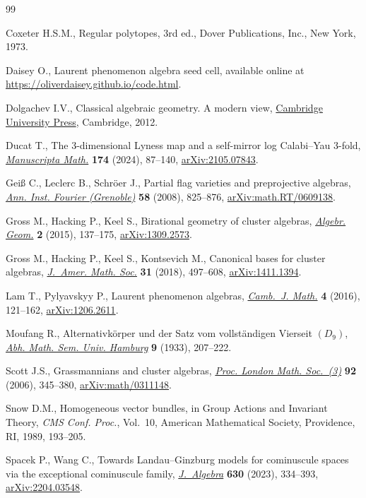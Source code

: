 \begin{thebibliography}{99}
\footnotesize\itemsep=0pt

Coxeter H.S.M., Regular polytopes, 3rd ed., Dover Publications, Inc., New York,
 1973.

Daisey O., Laurent phenomenon algebra seed cell, available online at
 \url{https://oliverdaisey.github.io/code.html}.

Dolgachev I.V., Classical algebraic geometry. {A} modern view, \href{https://doi.org/10.1017/CBO9781139084437}{Cambridge
 University Press}, Cambridge, 2012.

Ducat T., The 3-dimensional {L}yness map and a self-mirror log {C}alabi--{Y}au
 3-fold, \href{https://doi.org/10.1007/s00229-023-01497-0}{\textit{Manuscripta Math.}} \textbf{174} (2024), 87--140,
 \href{https://arxiv.org/abs/2105.07843}{arXiv:2105.07843}.

Gei{\ss} C., Leclerc B., Schr\"oer J., Partial flag varieties and preprojective
 algebras, \href{https://doi.org/10.5802/aif.2371}{\textit{Ann. Inst. Fourier (Grenoble)}} \textbf{58} (2008),
 825--876, \href{https://arxiv.org/abs/math.RT/0609138}{arXiv:math.RT/0609138}.

Gross M., Hacking P., Keel S., Birational geometry of cluster algebras,
 \href{https://doi.org/10.14231/AG-2015-007}{\textit{Algebr. Geom.}} \textbf{2} (2015), 137--175, \href{https://arxiv.org/abs/1309.2573}{arXiv:1309.2573}.

Gross M., Hacking P., Keel S., Kontsevich M., Canonical bases for cluster
 algebras, \href{https://doi.org/10.1090/jams/890}{\textit{J.~Amer. Math. Soc.}} \textbf{31} (2018), 497--608,
 \href{https://arxiv.org/abs/1411.1394}{arXiv:1411.1394}.

Lam T., Pylyavskyy P., Laurent phenomenon algebras, \href{https://doi.org/10.4310/CJM.2016.v4.n1.a2}{\textit{Camb.~J. Math.}}
 \textbf{4} (2016), 121--162, \href{https://arxiv.org/abs/1206.2611}{arXiv:1206.2611}.

Moufang R., Alternativk\"orper und der {S}atz vom vollst\"andigen {V}ierseit
 {$(D_9)$}, \href{https://doi.org/10.1007/BF02940648}{\textit{Abh. Math. Sem. Univ. Hamburg}} \textbf{9} (1933),
 207--222.

Scott J.S., Grassmannians and cluster algebras, \href{https://doi.org/10.1112/S0024611505015571}{\textit{Proc. London Math.
 Soc.~(3)}} \textbf{92} (2006), 345--380, \href{https://arxiv.org/abs/math/0311148}{arXiv:math/0311148}.

Snow D.M., Homogeneous vector bundles, in Group {A}ctions and {I}nvariant
 {T}heory, \textit{CMS Conf. Proc.}, Vol.~10, American Mathematical Society,
 Providence, RI, 1989, 193--205.

Spacek P., Wang C., Towards {L}andau--{G}inzburg models for cominuscule spaces
 via the exceptional cominuscule family, \href{https://doi.org/10.1016/j.jalgebra.2023.03.039}{\textit{J.~Algebra}} \textbf{630}
 (2023), 334--393, \href{https://arxiv.org/abs/2204.03548}{arXiv:2204.03548}.

\end{thebibliography}
